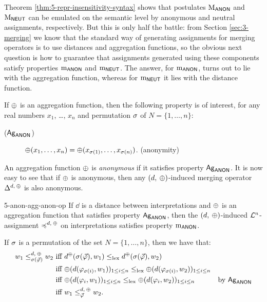 Theorem \ref{thm:5-repr-insensitivity-syntax} shows that postulates $\mathrm{M}_{\mathsf{ANON}}$
and $\mathrm{M}_{\mathsf{NEUT}}$ can be emulated on the semantic level by anonymous and neutral 
assignments, respectively.
But this is only half the battle:
from Section \ref{sec:3-merging} we know that 
the standard way of generating assignments for merging operators 
is to use distances and aggregation functions, so the obvious next question 
is how to guarantee that assignments generated using these components satisfy properties 
$\mathrm{m}_{\mathsf{ANON}}$ and $\mathrm{m}_{\mathsf{NEUT}}$.
The answer, for $\mathrm{m}_{\mathsf{ANON}}$, turns out to lie with the aggregation function, 
whereas for $\mathrm{m}_{\mathsf{NEUT}}$ it lies with the distance function.

If ${\operatorname{\oplus}}$ is an aggregation function,
then the following property is of interest,
for any real numbers $x_1$, \dots, $x_n$ and permutation 
$\sigma$ of $N=\{1,\dots,n\}$:

\begin{description}
	\item[($\mathsf{Ag}_{{\mathsf{ANON}}}$)] ${\operatorname{\oplus}}(x_1,\dots,x_n) = {\operatorname{\oplus}}(x_{\sigma(1)},\dots,x_{\sigma(n)})$. \hfill(anonymity)
\end{description}
An aggregation function ${\operatorname{\oplus}}$ is \emph{anonymous} if it satisfies property $\mathsf{Ag}_{{\mathsf{ANON}}}$.
It is now easy to see that if ${\operatorname{\oplus}}$ is anonymous,
then any $(d,\:{\operatorname{\oplus}})$-induced merging operator $\Delta^{d,\:{\operatorname{\oplus}}}$ is also anonymous.

\begin{prp}{}{5-anon-agg-anon-op}
	If $\dd$ is a distance between interpretations and ${\operatorname{\oplus}}$ is an 
	aggregation function that satisfies property $\mathsf{Ag}_{{\mathsf{ANON}}}$,
	then the $(d,\:{\operatorname{\oplus}})$-induced $\mathcal{L}^n$-assignment 
	$\preccurlyeq^{d,\:{\operatorname{\oplus}}}$ on interpretations satisfies property $\mathrm{m}_{\mathsf{ANON}}$.
\end{prp}
\begin{prf*}{}{}%
	If $\sigma$ is a permutation of the set $N=\{1,\dots,n\}$,
	then we have that:
	\begin{align*}
		w_1\le^{d,\:{\operatorname{\oplus}}}_{\sigma({\vec{\varphi}})}w_2~&\text{iff}~d^{{\operatorname{\oplus}}}(\sigma({\vec{\varphi}}),w_1)\le_{{\operatorname{lex}}}d^{{\operatorname{\oplus}}}(\sigma({\vec{\varphi}}),w_2)&\\
										   &\text{iff}~{\operatorname{\oplus}}(d(\varphi_{\sigma(i)},w_1))_{1\le i\le n}\le_{{\operatorname{lex}}}{\operatorname{\oplus}}(d(\varphi_{\sigma(i)},w_2))_{1\le i\le n}&\\
										   &\text{iff}~{\operatorname{\oplus}}(d(\varphi_{i},w_1))_{1\le i\le n}\le_{{\operatorname{lex}}}{\operatorname{\oplus}}(d(\varphi_{i},w_2))_{1\le i\le n}&\text{by}~\mathsf{Ag}_{{\mathsf{ANON}}}\\
										   &\text{iff}~w_1\le^{d,\:{\operatorname{\oplus}}}_{{\vec{\varphi}}}w_2.&
	\end{align*}
\end{prf*}

